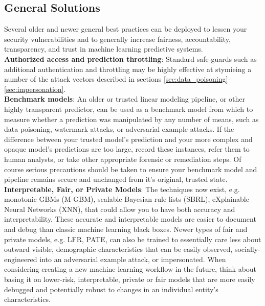 \documentclass[fleqn]{article}
\begin{document}
\subsection{General Solutions}

Several older and newer general best practices can be deployed to lessen your security vulnerabilities and to generally increase fairness, accountability, transparency, and trust in machine learning predictive systems.\\ 

\noindent\textbf{Authorized access and prediction throttling}: Standard safe-guards such as additional authentication and throttling may be highly effective at stymieing a number of the attack vectors described in sections \ref{sec:data_poisoning}--\ref{sec:impersonation}.\\

\noindent\textbf{Benchmark models}: An older or trusted linear modeling pipeline, or other highly transparent predictor, can be used as a benchmark model from which to measure whether a prediction was manipulated by any number of means, such as data poisoning, watermark attacks, or adversarial example attacks. If the difference between your trusted model's prediction and your more complex and opaque model's predictions are too large, record these instances, refer them to human analysts, or take other appropriate forensic or remediation steps. Of course serious precautions should be taken to ensure your benchmark model and pipeline remains secure and unchanged from it's original, trusted state.\\

\noindent\textbf{Interpretable, Fair, or Private Models}: The techniques now exist, e.g. monotonic GBMs (M-GBM), scalable Bayesian rule lists (SBRL), eXplainable Neural Networks (XNN), that could allow you to have both accuracy and interpretability. These accurate and interpretable models are easier to document and debug than classic machine learning black boxes. Newer types of fair and private models, e.g. LFR, PATE, can also be trained to essentially care less about outward visible, demographic characteristics that can be easily observed, socially-engineered into an adversarial example attack, or impersonated. When considering creating a new machine learning workflow in the future, think about basing it on lower-risk, interpretable, private or fair models that are more easily debugged and potentially robust to changes in an individual entity's characteristics.\\
\end{document}
